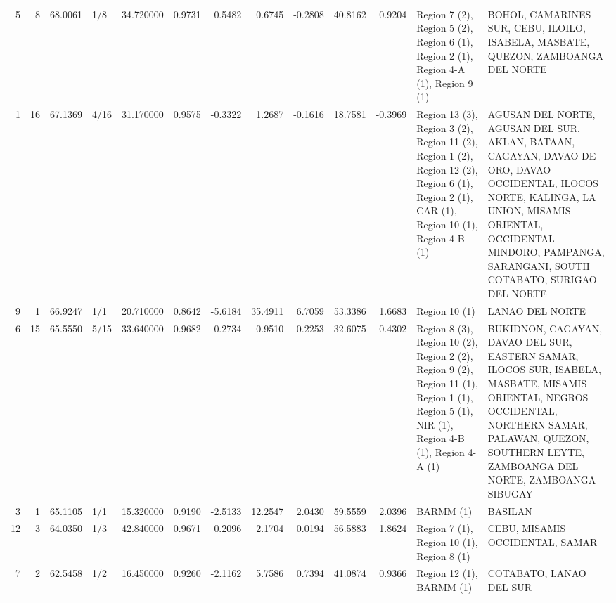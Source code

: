\begin{tabular}{rrrlrrrrrrrll}
5 & 8 & {\cellcolor[HTML]{EF886B}} \color[HTML]{F1F1F1} 68.0061 & 1/8 & {\cellcolor[HTML]{F7AA8C}} \color[HTML]{000000} 34.720000 & 0.9731 & 0.5482 & 0.6745 & -0.2808 & 40.8162 & 0.9204 & Region 7 (2), Region 5 (2), Region 6 (1), Region 2 (1), Region 4-A (1), Region 9 (1) & BOHOL, CAMARINES SUR, CEBU, ILOILO, ISABELA, MASBATE, QUEZON, ZAMBOANGA DEL NORTE \\
1 & 16 & {\cellcolor[HTML]{F29274}} \color[HTML]{F1F1F1} 67.1369 & 4/16 & {\cellcolor[HTML]{EED0C0}} \color[HTML]{000000} 31.170000 & 0.9575 & -0.3322 & 1.2687 & -0.1616 & 18.7581 & -0.3969 & Region 13 (3), Region 3 (2), Region 11 (2), Region 1 (2), Region 12 (2), Region 6 (1), Region 2 (1), CAR (1), Region 10 (1), Region 4-B (1) & AGUSAN DEL NORTE, AGUSAN DEL SUR, AKLAN, BATAAN, CAGAYAN, DAVAO DE ORO, DAVAO OCCIDENTAL, ILOCOS NORTE, KALINGA, LA UNION, MISAMIS ORIENTAL, OCCIDENTAL MINDORO, PAMPANGA, SARANGANI, SOUTH COTABATO, SURIGAO DEL NORTE \\
9 & 1 & {\cellcolor[HTML]{F39475}} \color[HTML]{000000} 66.9247 & 1/1 & {\cellcolor[HTML]{7A9DF8}} \color[HTML]{F1F1F1} 20.710000 & 0.8642 & -5.6184 & 35.4911 & 6.7059 & 53.3386 & 1.6683 & Region 10 (1) & LANAO DEL NORTE \\
6 & 15 & {\cellcolor[HTML]{F5A081}} \color[HTML]{000000} 65.5550 & 5/15 & {\cellcolor[HTML]{F7B89C}} \color[HTML]{000000} 33.640000 & 0.9682 & 0.2734 & 0.9510 & -0.2253 & 32.6075 & 0.4302 & Region 8 (3), Region 10 (2), Region 2 (2), Region 9 (2), Region 11 (1), Region 1 (1), Region 5 (1), NIR (1), Region 4-B (1), Region 4-A (1) & BUKIDNON, CAGAYAN, DAVAO DEL SUR, EASTERN SAMAR, ILOCOS SUR, ISABELA, MASBATE, MISAMIS ORIENTAL, NEGROS OCCIDENTAL, NORTHERN SAMAR, PALAWAN, QUEZON, SOUTHERN LEYTE, ZAMBOANGA DEL NORTE, ZAMBOANGA SIBUGAY \\
3 & 1 & {\cellcolor[HTML]{F6A385}} \color[HTML]{000000} 65.1105 & 1/1 & {\cellcolor[HTML]{3B4CC0}} \color[HTML]{F1F1F1} 15.320000 & 0.9190 & -2.5133 & 12.2547 & 2.0430 & 59.5559 & 2.0396 & BARMM (1) & BASILAN \\
12 & 3 & {\cellcolor[HTML]{F7AD90}} \color[HTML]{000000} 64.0350 & 1/3 & {\cellcolor[HTML]{B40426}} \color[HTML]{F1F1F1} 42.840000 & 0.9671 & 0.2096 & 2.1704 & 0.0194 & 56.5883 & 1.8624 & Region 7 (1), Region 10 (1), Region 8 (1) & CEBU, MISAMIS OCCIDENTAL, SAMAR \\
7 & 2 & {\cellcolor[HTML]{F7B89C}} \color[HTML]{000000} 62.5458 & 1/2 & {\cellcolor[HTML]{465ECF}} \color[HTML]{F1F1F1} 16.450000 & 0.9260 & -2.1162 & 5.7586 & 0.7394 & 41.0874 & 0.9366 & Region 12 (1), BARMM (1) & COTABATO, LANAO DEL SUR \\

\end{tabular}
